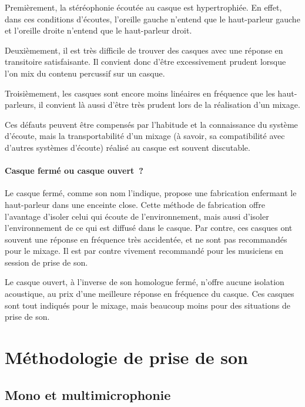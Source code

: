 \documentclass[
]{book}
\begin{document}
Premièrement, la stéréophonie écoutée au casque est hypertrophiée. En effet, dans ces conditions d'écoutes, l'oreille gauche n'entend que le haut-parleur gauche et l'oreille droite n'entend que le haut-parleur droit.

Deuxièmement, il est très difficile de trouver des casques avec une réponse en transitoire satisfaisante. Il convient donc d'être excessivement prudent lorsque l'on mix du contenu percussif sur un casque.

Troisièmement, les casques sont encore moins linéaires en fréquence que les haut-parleurs, il convient là aussi d'être très prudent lors de la réalisation d'un mixage.

Ces défauts peuvent être compensés par l'habitude et la connaissance du système d'écoute, mais la transportabilité d'un mixage (à savoir, sa compatibilité avec d'autres systèmes d'écoute) réalisé au casque est souvent discutable.

\hypertarget{casque-fermuxe9-ou-casque-ouvert}{%
\subsection{Casque fermé ou casque ouvert~?}\label{casque-fermuxe9-ou-casque-ouvert}}

Le casque fermé, comme son nom l'indique, propose une fabrication enfermant le haut-parleur dans une enceinte close. Cette méthode de fabrication offre l'avantage d'isoler celui qui écoute de l'environnement, mais aussi d'isoler l'environnement de ce qui est diffusé dans le casque. Par contre, ces casques ont souvent une réponse en fréquence très accidentée, et ne sont pas recommandés pour le mixage. Il est par contre vivement recommandé pour les musiciens en session de prise de son.

Le casque ouvert, à l'inverse de son homologue fermé, n'offre aucune isolation acoustique, au prix d'une meilleure réponse en fréquence du casque. Ces casques sont tout indiqués pour le mixage, mais beaucoup moins pour des situations de prise de son.

\hypertarget{part-muxe9thodologie-de-prise-de-son}{%
\part{Méthodologie de prise de son}\label{part-muxe9thodologie-de-prise-de-son}}

\hypertarget{mono-et-multimicrophonie}{%
\chapter{Mono et multimicrophonie}\label{mono-et-multimicrophonie}}
\end{document}
